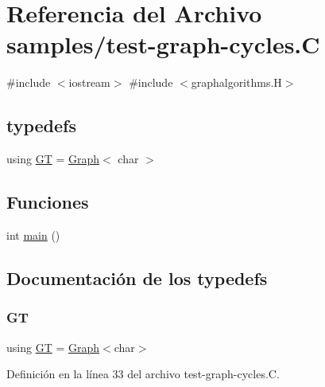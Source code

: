\hypertarget{test-graph-cycles_8_c}{}\section{Referencia del Archivo samples/test-\/graph-\/cycles.C}
\label{test-graph-cycles_8_c}
{\ttfamily \#include $<$iostream$>$}\newline
{\ttfamily \#include $<$graphalgorithms.\+H$>$}\newline
\subsection*{typedefs}
\begin{DoxyCompactItemize}
\item 
using \hyperlink{test-graph-cycles_8_c_a867adda87f9db275997db57644adc40f}{GT} = \hyperlink{class_designar_1_1_graph}{Graph}$<$ char $>$
\end{DoxyCompactItemize}
\subsection*{Funciones}
\begin{DoxyCompactItemize}
\item 
int \hyperlink{test-graph-cycles_8_c_ae66f6b31b5ad750f1fe042a706a4e3d4}{main} ()
\end{DoxyCompactItemize}


\subsection{Documentación de los \textquotesingle{}typedefs\textquotesingle{}}
\mbox{\label{test-graph-cycles_8_c_a867adda87f9db275997db57644adc40f}} 
\subsubsection{\texorpdfstring{GT}{GT}}
{\footnotesize\ttfamily using \hyperlink{demo-buildgraph_8_c_a3001c40d2c31ca87ed96cd7d1334a55e}{GT} =  \hyperlink{class_designar_1_1_graph}{Graph}$<$char$>$}



Definición en la línea 33 del archivo test-\/graph-\/cycles.\+C.



